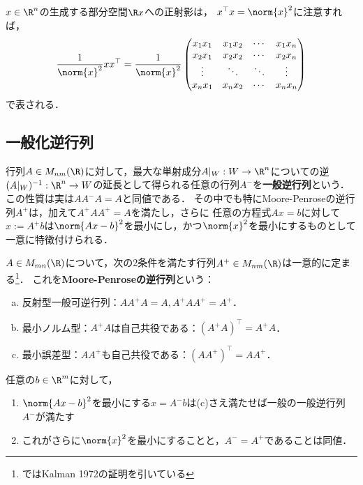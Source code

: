\documentclass[uplatex,dvipdfmx]{jsarticle}
\begin{document}
\begin{example}[直線への正射影を表す行列]
    $x\in\R^n$の生成する部分空間$\R x$への正射影は，
    $x^\top x=\norm{x}^2$に注意すれば，
    \[\frac{1}{\norm{x}^2}xx^\top=\frac{1}{\norm{x}^2}\begin{pmatrix}x_1x_1&x_1x_2&\cdots&x_1x_n\\x_2x_1&x_2x_2&\cdots&x_2x_n\\\vdots&\ddots&\ddots&\vdots\\x_nx_1&x_nx_2&\cdots&x_nx_n\end{pmatrix}\]
    で表される．
\end{example}

\subsection{一般化逆行列}

\begin{tcolorbox}[colframe=ForestGreen, colback=ForestGreen!10!white,breakable,colbacktitle=ForestGreen!40!white,coltitle=black,fonttitle=\bfseries\sffamily,
title=]
    行列$A\in M_{nm}(\R)$に対して，最大な単射成分$A|_W:W\to \R^n$についての逆$(A|_W)^{-1}:\R^n\to W$の延長として得られる任意の行列$A^-$を\textbf{一般逆行列}という\cite{CRRao62-GeneralizedInverse}．
    この性質は実は$AA^-A=A$と同値である．
    その中でも特にMoore-Penroseの逆行列$A^+$は，加えて$A^+AA^+=A$を満たし，さらに
    任意の方程式$Ax=b$に対して$x:=A^+b$は$\norm{Ax-b}^2$を最小にし，かつ$\norm{x}^2$を最小にするものとして一意に特徴付けられる．
\end{tcolorbox}

\begin{definition}\label{def-Moore-Penrose}
    $A\in M_{mn}(\R)$について，次の2条件を満たす行列$A^+\in M_{nm}(\R)$は一意的に定まる\footnote{\cite{柳井-竹内-一般逆行列}ではKalman 1972の証明を引いている}．
    これを\textbf{Moore-Penroseの逆行列}という：
    \begin{enumerate}[(a)]
        \item 反射型一般可逆行列：$AA^+A=A,A^+AA^+=A^+$．
        \item 最小ノルム型：$A^+A$は自己共役である：$(A^+A)^\top=A^+A$．
        \item 最小誤差型：$AA^+$も自己共役である：$(AA^+)^\top=AA^+$．
    \end{enumerate}
\end{definition}

\begin{proposition}
    任意の$b\in\R^m$に対して，
    \begin{enumerate}
        \item $\norm{Ax-b}^{2}$を最小にする$x=A^-b$は(c)さえ満たせば一般の一般逆行列$A^-$が満たす
        \item これがさらに$\norm{x}^2$を最小にすることと，$A^-=A^+$であることは同値．
    \end{enumerate}
\end{proposition}
\end{document}
